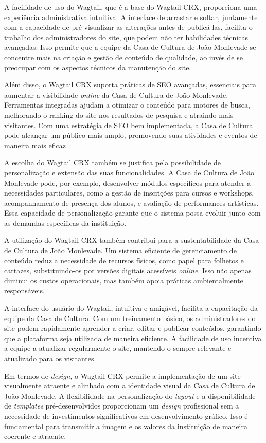 A facilidade de uso do Wagtail, que é a base do Wagtail CRX, proporciona uma experiência administrativa intuitiva. A interface de arrastar e soltar, juntamente com a capacidade de pré-visualizar as alterações antes de publicá-las, facilita o trabalho dos administradores do site, que podem não ter habilidades técnicas avançadas. Isso permite que a equipe da Casa de Cultura de João Monlevade se concentre mais na criação e gestão de conteúdo de qualidade, ao invés de se preocupar com os aspectos técnicos da manutenção do site.

Além disso, o Wagtail CRX suporta práticas de \ac{SEO} avançadas, essenciais para aumentar a visibilidade \textit{online} da Casa de Cultura de João Monlevade. Ferramentas integradas ajudam a otimizar o conteúdo para motores de busca, melhorando o ranking do site nos resultados de pesquisa e atraindo mais visitantes. Com uma estratégia de \ac{SEO} bem implementada, a Casa de Cultura pode alcançar um público mais amplo, promovendo suas atividades e eventos de maneira mais eficaz \cite{WagtailCRXSEO}.

A escolha do Wagtail CRX também se justifica pela possibilidade de personalização e extensão das suas funcionalidades. A Casa de Cultura de João Monlevade pode, por exemplo, desenvolver módulos específicos para atender a necessidades particulares, como a gestão de inscrições para cursos e workshops, acompanhamento de presença dos alunos, e avaliação de performances artísticas. Essa capacidade de personalização garante que o sistema possa evoluir junto com as demandas específicas da instituição.

A utilização do Wagtail CRX também contribui para a sustentabilidade da Casa de Cultura de João Monlevade. Um sistema eficiente de gerenciamento de conteúdo reduz a necessidade de recursos físicos, como papel para folhetos e cartazes, substituindo-os por versões digitais acessíveis \textit{online}. Isso não apenas diminui os custos operacionais, mas também apoia práticas ambientalmente responsáveis.

A interface do usuário do Wagtail, intuitiva e amigável, facilita a capacitação da equipe da Casa de Cultura. Com um treinamento básico, os administradores do site podem rapidamente aprender a criar, editar e publicar conteúdos, garantindo que a plataforma seja utilizada de maneira eficiente. A facilidade de uso incentiva a equipe a atualizar regularmente o site, mantendo-o sempre relevante e atualizado para os visitantes.

Em termos de \textit{design}, o Wagtail CRX permite a implementação de um site visualmente atraente e alinhado com a identidade visual da Casa de Cultura de João Monlevade. A flexibilidade na personalização do \textit{layout} e a disponibilidade de \textit{templates} pré-desenvolvidos proporcionam um \textit{design} profissional sem a necessidade de investimentos significativos em desenvolvimento gráfico. Isso é fundamental para transmitir a imagem e os valores da instituição de maneira coerente e atraente.

